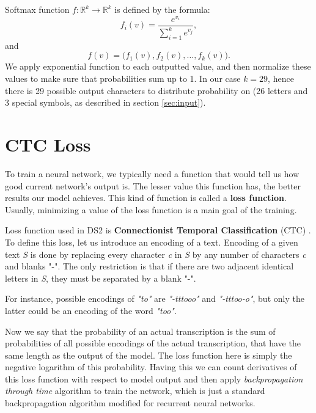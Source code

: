 \documentclass[licencjacka,en]{pracamgr}
\begin{document}
	Softmax function $f : \mathbb{R}^k \rightarrow \mathbb{R}^k$ is defined by the formula:
	$$
	f_i(v) = \frac{e^{v_i}}{\sum_{i=1}^{k} e^{v_j}},
	$$
	and
	$$
	f(v) = \big(f_1(v), f_2(v), \ldots, f_k(v) \big).
	$$
	We apply exponential function to each outputted value, and then normalize these values to make sure that probabilities sum up to 1. In our case $k=29$, hence there is 29 possible output characters to distribute probability on (26 letters and 3 special symbols, as described in section \ref{sec:input}).
	
	\section{CTC Loss} \label{sec:ctc}
	To train a neural network, we typically need a function that would tell us how good current network's output is. The lesser value this function has, the better results our model achieves. This kind of function is called a \textbf{loss function}. Usually, minimizing a value of the loss function is a main goal of the training.
	
	Loss function used in DS2 is \textbf{Connectionist Temporal Classification} (CTC) \cite{DS3}. To define this loss, let us introduce an encoding of a text. Encoding of a given text \textit{S} is done by replacing every character \textit{c} in \textit{S} by any number of characters \textit{c} and blanks "-". The only restriction is that if there are two adjacent identical letters in \textit{S}, they must be separated by a blank "-".
	
	For instance, possible encodings of \textit{"to"} are \textit{"-tttooo"} and \textit{"-tttoo-o"}, but only the latter could be an encoding of the word \textit{"too"}.
	
	Now we say that the probability of an actual transcription is the sum of probabilities of all possible encodings of the actual transcription, that have the same length as the output of the model. The loss function here is simply the negative logarithm of this probability. Having this we can count derivatives of this loss function with respect to model output and then apply \textit{backpropagation through time} algorithm to train the network, which is just a standard backpropagation algorithm modified for recurrent neural networks.
	
\end{document}
